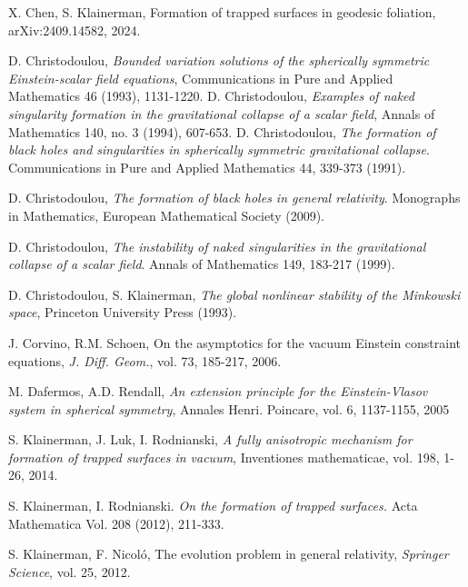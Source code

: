 \documentclass{amsart}
\begin{document}
{\begin{thebibliography}{}
 X. Chen, S. Klainerman, Formation of trapped surfaces in geodesic foliation, arXiv:2409.14582, 2024. 








 D. Christodoulou, \textit{Bounded variation solutions of the spherically symmetric Einstein-scalar field equations}, Communications in Pure and Applied Mathematics 46 (1993), 1131-1220. 
 D. Christodoulou, \textit{Examples of naked singularity formation in the gravitational collapse of a scalar field}, Annals of Mathematics 140, no. 3 (1994), 607-653. 
 D. Christodoulou, \textit{The formation of black holes and singularities in spherically symmetric gravitational collapse}. Communications in Pure and Applied Mathematics 44, 339-373 (1991).


 D. Christodoulou, \textit{The formation of black holes in general relativity}. Monographs in Mathematics, European Mathematical Society (2009).

 D. Christodoulou, \textit{The instability of naked singularities in the gravitational collapse of a scalar field}. Annals of Mathematics 149, 183-217 (1999).

 D. Christodoulou, S. Klainerman, \textit{The global nonlinear stability of the Minkowski space}, Princeton University Press (1993).




 J. Corvino, R.M. Schoen, On the asymptotics for the vacuum Einstein constraint equations, \textit{J. Diff. Geom.}, vol. 73, 185-217, 2006. 




 M. Dafermos, A.D. Rendall, \textit{An extension principle for the Einstein-Vlasov system in spherical symmetry}, Annales Henri. Poincare, vol. 6, 1137-1155, 2005 



 S. Klainerman, J. Luk, I. Rodnianski, \textit{A fully anisotropic mechanism for formation of trapped surfaces in vacuum}, Inventiones mathematicae, vol. 198, 1-26, 2014.  





  S. Klainerman, I. Rodnianski. \textit{On the formation of trapped surfaces.} Acta Mathematica Vol. 208 (2012), 
211-333.

 S. Klainerman, F. Nicol\'o, The evolution problem in general relativity, \textit{Springer Science}, vol. 25, 2012. 


\end{thebibliography}}
\end{document}

